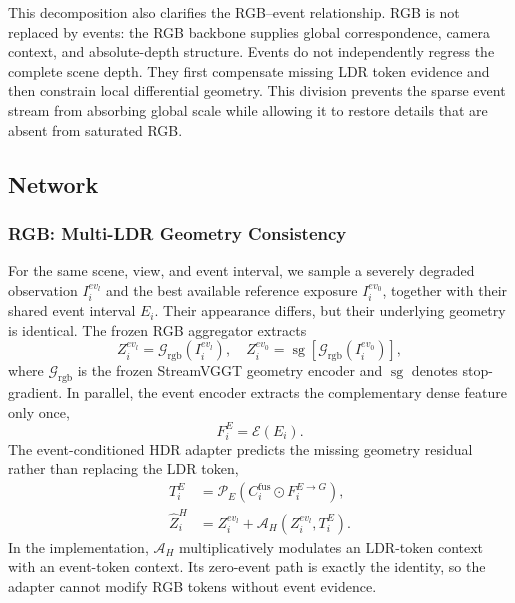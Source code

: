 This decomposition also clarifies the RGB--event relationship. RGB is not
replaced by events: the RGB backbone supplies global correspondence, camera
context, and absolute-depth structure. Events do not independently regress
the complete scene depth. They first compensate missing LDR token evidence and
then constrain local differential geometry. This division prevents the sparse
event stream from absorbing global scale while allowing it to restore details
that are absent from saturated RGB.

\subsection{Network}
\label{sec:network}

\subsubsection{RGB: Multi-LDR Geometry Consistency}
\label{sec:multi_ldr}

For the same scene, view, and event interval, we sample a severely degraded
observation $I_i^{ev_l}$ and the best available reference exposure
$I_i^{ev_0}$, together with their shared event interval $E_i$. Their
appearance differs, but their underlying geometry is identical. The frozen RGB
aggregator extracts
\begin{equation}
    Z_i^{ev_l}=\mathcal G_{\mathrm{rgb}}(I_i^{ev_l}),
    \quad
    Z_i^{ev_0}=\operatorname{sg}
    [\mathcal G_{\mathrm{rgb}}(I_i^{ev_0})],
\end{equation}
where $\mathcal G_{\mathrm{rgb}}$ is the frozen StreamVGGT geometry encoder and
$\operatorname{sg}$ denotes stop-gradient. In parallel, the event encoder
extracts the complementary dense feature only once,
\begin{equation}
    F_i^E=\mathcal E(E_i).
\end{equation}
The event-conditioned HDR adapter predicts the missing geometry residual
rather than replacing the LDR token,
\begin{align}
    T_i^E
    &=\mathcal P_E(C_i^{\mathrm{fus}}\odot F_i^{E\rightarrow G}),\\
    \widehat Z_i^{H}
    &=Z_i^{ev_l}+\mathcal A_H(Z_i^{ev_l},T_i^E).
\end{align}
In the implementation, $\mathcal A_H$ multiplicatively modulates an LDR-token
context with an event-token context. Its zero-event path is exactly the
identity, so the adapter cannot modify RGB tokens without event evidence.


